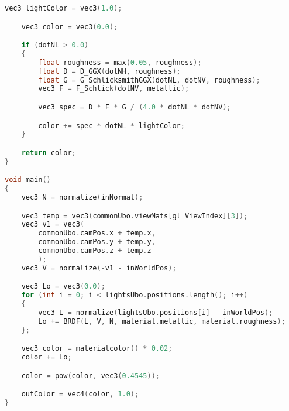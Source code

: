 \begin{itemize}
\begin{lstlisting}[language=c++, caption=PBR fragment shader(./assets/shaders/pbr.frag)]
    vec3 lightColor = vec3(1.0);

    vec3 color = vec3(0.0);

    if (dotNL > 0.0)
    {
        float roughness = max(0.05, roughness);
        float D = D_GGX(dotNH, roughness);
        float G = G_SchlicksmithGGX(dotNL, dotNV, roughness);
        vec3 F = F_Schlick(dotNV, metallic);

        vec3 spec = D * F * G / (4.0 * dotNL * dotNV);

        color += spec * dotNL * lightColor;
    }

    return color;
}

void main()
{
    vec3 N = normalize(inNormal);

    vec3 temp = vec3(commonUbo.viewMats[gl_ViewIndex][3]);
    vec3 v1 = vec3(
        commonUbo.camPos.x + temp.x,
        commonUbo.camPos.y + temp.y,
        commonUbo.camPos.z + temp.z
        );
    vec3 V = normalize(-v1 - inWorldPos);

    vec3 Lo = vec3(0.0);
    for (int i = 0; i < lightsUbo.positions.length(); i++)
    {
        vec3 L = normalize(lightsUbo.positions[i] - inWorldPos);
        Lo += BRDF(L, V, N, material.metallic, material.roughness);
    };

    vec3 color = materialcolor() * 0.02;
    color += Lo;

    color = pow(color, vec3(0.4545));

    outColor = vec4(color, 1.0);
}
\end{lstlisting}
\end{itemize}